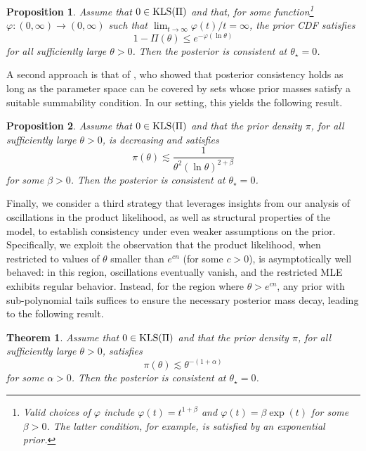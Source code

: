 \documentclass[11pt,twoside]{article}
\newtheorem{theorem}{Theorem}
\newtheorem{proposition}{Proposition}
\newcommand{\kls}{\textnormal{KLS}}
\begin{document}
\begin{proposition}\label{pro:G-VdV_consistency}
    Assume that $0 \in \kls(\Pi)$ and that, for some function\footnote{Valid choices of $\varphi$ include $\varphi(t) = t^{1+\beta}$ and $\varphi(t) = \beta \exp(t)$ for some $\beta > 0$. The latter condition, for example, is satisfied by an exponential prior.} $\varphi : (0, \infty) \to (0,\infty)$ such that $\lim_{t \to \infty} \varphi(t)/t = \infty$, the prior CDF satisfies
    \begin{equation*}
        1 - \Pi(\theta) \leq e^{-\varphi(\ln \theta)}
    \end{equation*}
    for all sufficiently large $\theta > 0$. Then the posterior is consistent at $\theta_\star = 0$.
\end{proposition}

A second approach is that of \cite{walker2004squarerootsum}, who showed that posterior consistency holds as long as the parameter space can be covered by sets whose prior masses satisfy a suitable summability condition. In our setting, this yields the following result.

\begin{proposition}\label{pro:consistency_walker2004}
    Assume that $0 \in \kls(\Pi)$ and that the prior density $\pi$, for all sufficiently large $\theta > 0$, is decreasing and satisfies
    \begin{equation}\label{eq:tail_condition_sqrt}
        \pi(\theta) \lesssim \frac{1}{\theta^2 (\ln \theta)^{2 + \beta}}
    \end{equation}
    for some $\beta > 0$. Then the posterior is consistent at $\theta_\star = 0$.
\end{proposition}

Finally, we consider a third strategy that leverages insights from our analysis of oscillations in the product likelihood, as well as structural properties of the model, to establish consistency under even weaker assumptions on the prior. Specifically, we exploit the observation that the product likelihood, when restricted to values of $\theta$ smaller than $e^{cn}$ (for some $c > 0$), is asymptotically well behaved: in this region, oscillations eventually vanish, and the restricted MLE exhibits regular behavior. Instead, for the region where $\theta > e^{cn}$, any prior with sub-polynomial tails suffices to ensure the necessary posterior mass decay, leading to the following result.



\begin{theorem}\label{thm:our_consistency}
    Assume that $0 \in \kls(\Pi)$ and that the prior density \(\pi\), for all sufficiently large \(\theta > 0\), satisfies  
    \[
    \pi(\theta) \lesssim \theta^{-(1+\alpha)}
    \]  
    for some $\alpha > 0$. Then the posterior is consistent at $\theta_\star = 0$.
\end{theorem}
\end{document}
